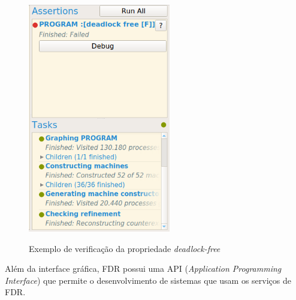\begin{figure}[h]
\centering
\caption{Exemplo de verificação da propriedade \textit{deadlock-free}}
\includegraphics[height=10cm]{figuras/assertion.png}
\label{fig:assertion}
\end{figure}


Além da interface gráfica, FDR possui uma API (\textit{Application Programming Interface}) que permite o desenvolvimento de sistemas que usam os serviços de FDR. 


